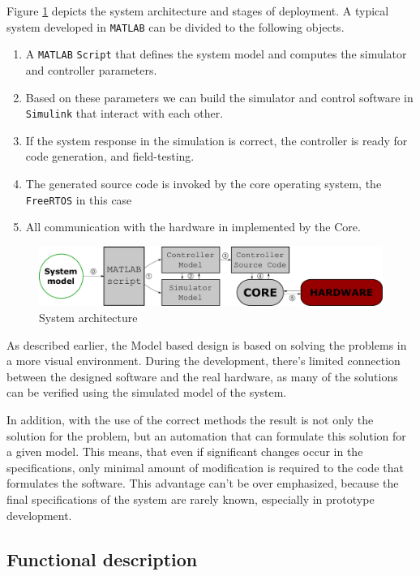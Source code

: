 Figure \ref{fig:architecture} depicts the system architecture and stages of deployment. A typical system developed in \verb!MATLAB! can be divided to the following objects.

\begin{enumerate}
\item A \verb!MATLAB! \verb!Script! that defines the system model and computes the simulator and controller parameters.
\item Based on these parameters we can build the simulator and control software in \verb!Simulink! that interact with each other.
\item If the system response in the simulation is correct, the controller is ready for code generation, and field-testing.
\item The generated source code is invoked by the core operating system, the \verb!FreeRTOS! in this case
\item All communication with the hardware in implemented by the Core.
\end{enumerate}

\begin{figure}[!ht]
    \centering
    \includegraphics[width=\linewidth]{img/architecture}
    \caption{System architecture}
    \label{fig:architecture}
\end{figure}


As described earlier, the Model based design is based on solving the problems in a more visual environment. During the development, there's  limited connection between the designed software and the real hardware, as many of the solutions can be verified using the simulated model of the system.

In addition, with the use of the correct methods the result is not only the solution for the problem, but an automation that can formulate this solution for a given model. This means, that even if significant changes occur in the specifications, only minimal amount of modification is required to the code that formulates the software. This advantage can't be over emphasized, because the final specifications of the system are rarely known, especially in prototype development.

\subsection{Functional description}

